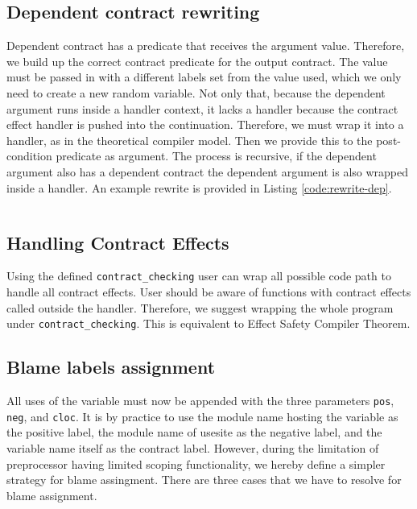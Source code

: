 \begin{listing}
\inputminted{ocaml}{code/rewrite-function.ml}
\caption{Functional contract rewrite}
\label{code:rewrite-function}
\end{listing}

\subsection{Dependent contract rewriting}

Dependent contract has a predicate that receives the argument value. Therefore,
we build up the correct contract predicate for the output contract. The value
must be passed in with a different labels set from the value used, which we
only need to create a new random variable. Not only that, because the dependent
argument runs inside a handler context, it lacks a handler because the contract
effect handler is pushed into the continuation. Therefore, we must wrap it into
a handler, as in the theoretical compiler model. Then we provide this to the
post-condition predicate as argument. The process is recursive, if the
dependent argument also has a dependent contract the dependent argument is also
wrapped inside a handler. An example rewrite is provided in Listing
\ref{code:rewrite-dep}.

\begin{listing}
\inputminted{ocaml}{code/rewrite-dep.ml}
\caption{Dependent contract rewrite}
\label{code:rewrite-dep}
\end{listing}

\subsection{Handling Contract Effects}

Using the defined \texttt{contract\_checking} user can wrap all possible code
path to handle all contract effects. User should be aware of functions with
contract effects called outside the handler. Therefore, we suggest wrapping the
whole program under \texttt{contract\_checking}. This is equivalent to Effect
Safety Compiler Theorem.

\subsection{Blame labels assignment}

All uses of the variable must now be appended with the three parameters
\texttt{pos}, \texttt{neg}, and \texttt{cloc}. It is by practice to use the
module name hosting the variable as the positive label, the module name of
usesite as the negative label, and the variable name itself as the contract
label. However, during the limitation of preprocessor having limited scoping
functionality, we hereby define a simpler strategy for blame assingment. There
are three cases that we have to resolve for blame assignment.

